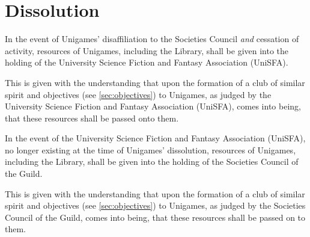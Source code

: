 \documentclass[a4paper]{article}
\begin{document}
\section{Dissolution} \label{sec:dissolution}
\begin{myEnumerate}
    \item In the event of Unigames' disaffiliation to the Societies Council \emph{and} cessation of activity, resources of Unigames, including the Library, shall be given into the holding of the University Science Fiction and Fantasy Association (UniSFA).
          \begin{myEnumerate}
              \item This is given with the understanding that upon the formation of a club of similar spirit and objectives (see \cref{sec:objectives}) to Unigames, as judged by the University Science Fiction and Fantasy Association (UniSFA), comes into being, that these resources shall be passed onto them.
          \end{myEnumerate}
    \item In the event of the University Science Fiction and Fantasy Association (UniSFA), no longer existing at the time of Unigames' dissolution, resources of Unigames, including the Library, shall be given into the holding of the Societies Council of the Guild.
          \begin{myEnumerate}
              \item This is given with the understanding that upon the formation of a club of similar spirit and objectives (see \cref{sec:objectives}) to Unigames, as judged by the Societies Council of the Guild, comes into being, that these resources shall be passed on to them.
          \end{myEnumerate}
\end{myEnumerate}
\end{document}
